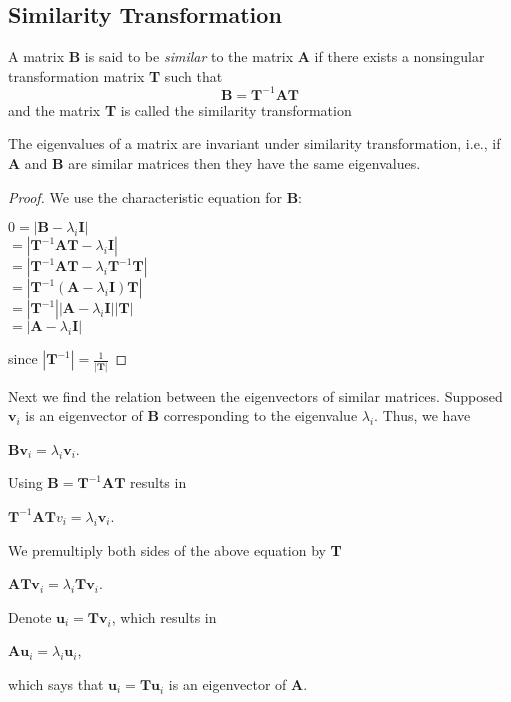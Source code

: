 \documentclass[conference,12pt,onecolumn,compsoc]{IEEEtran}
\begin{document}
\subsection{Similarity Transformation}
\label{section: Similarity Transformation}

\begin{definition}
A matrix \textbf{B} is said to be \emph{similar} to the matrix \textbf{A} if there exists a nonsingular transformation matrix \textbf{T} such that
\begin{equation}
\textbf{B} = \textbf{T}^{-1}\textbf{A}\textbf{T}
\label{transformation matrix}
\end{equation}
and the matrix \textbf{T} is called the similarity transformation
\end{definition}

\begin{proposition}
The eigenvalues of a matrix are invariant under similarity transformation, i.e., if \textbf{A} and \textbf{B} are similar matrices then they have the same eigenvalues. 
\end{proposition}
\begin{proof}
We use the characteristic equation for \textbf{B}:
\begin{center}
$0 = |\textbf{B} - \lambda_i\textbf{I}| $ \\
$= |\textbf{T}^{-1}\textbf{A}\textbf{T} - \lambda_i\textbf{I}| $ \\
$= |\textbf{T}^{-1}\textbf{A}\textbf{T} - \lambda_i\textbf{T}^{-1}\textbf{T}| $ \\
$= |\textbf{T}^{-1}(\textbf{A}-\lambda_i\textbf{I})\textbf{T}| $ \\
$= |\textbf{T}^{-1}||\textbf{A}-\lambda_i\textbf{I}||\textbf{T}| $ \\
$= |\textbf{A}-\lambda_i\textbf{I}| $ \\
\end{center}
since $|\textbf{T}^{-1}| = \frac{1}{|\textbf{T}|}$
\end{proof}

Next we find the relation between the eigenvectors of similar matrices. Supposed $\textbf{v}_i$ is an eigenvector of \textbf{B} corresponding to the eigenvalue $\lambda_i$. Thus, we have
\begin{center}
$\textbf{Bv}_i = \lambda_i\textbf{v}_i$.
\end{center}
Using $\textbf{B} = \textbf{T}^{-1}\textbf{AT}$ results in 
\begin{center}
$\textbf{T}^{-1}\textbf{AT}v_i = \lambda_i\textbf{v}_i$.
\end{center}
We premultiply both sides of the above equation by \textbf{T}
\begin{center}
$\textbf{ATv}_i = \lambda_i\textbf{Tv}_i$.
\end{center}
Denote $\textbf{u}_i = \textbf{Tv}_i$, which results in
\begin{center}
$\textbf{Au}_i = \lambda_i\textbf{u}_i$,
\end{center}
which says that $\textbf{u}_i = \textbf{Tu}_i$ is an eigenvector of \textbf{A}.
\end{document}
